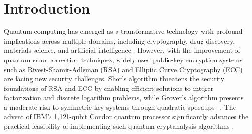 \documentclass[10pt,conference]{IEEEtran}
\begin{document}



\maketitle



\section{Introduction}



Quantum computing has emerged as a transformative technology with profound implications across multiple domains, including cryptography, drug discovery, materials science, and artificial intelligence \cite{Preskill_2018, 8585034, Alan, biamonte2017quantum}. However, with the improvement of quantum error correction techniques, widely used public-key encryption systems such as Rivest-Shamir-Adleman (RSA) and Elliptic Curve Cryptography (ECC) are facing new security challenges. Shor’s algorithm threatens the security foundations of RSA and ECC by enabling efficient solutions to integer factorization and discrete logarithm problems, while Grover’s algorithm presents a moderate risk to symmetric-key systems through quadratic speedups ~\cite{365700,grover1998framework}. The advent of IBM’s 1,121-qubit Condor quantum processor significantly advances the practical feasibility of implementing such quantum cryptanalysis algorithms \cite{ibm_quantum_roadmap}. 
\end{document}
